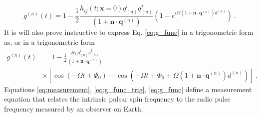 \documentclass[fleqn,usenatbib,useAMS]{mnras}
\begin{document}
\begin{equation}
	g^{(n)}(t) = 1 -  \frac{1}{2} \frac{h_{ij} (t; \boldsymbol{x}= 0)q^{i}_{(n)} q^{j}_{(n)} }{(1 + \boldsymbol{n}\cdot \boldsymbol{q}^{(n)}) }  \left(1 -e^{i \Omega \left(1 + \boldsymbol{n}\cdot \boldsymbol{q}^{(n)} \right)  d^{(n)}}\right) \ .
	\label{eq:g_func}
\end{equation}
It is will also prove instructive to express Eq. \ref{eq:g_func} in a trigonometric form as,
or in a trigonometric form 
\begin{align}
	g^{(n)}(t) &= 1 - \frac{1}{2} \frac{ H_{ij}q^i_{(n)} q^j_{(n)} }{(1 + \boldsymbol{n}\cdot \boldsymbol{q}^{(n)}) } \nonumber \\
	& \times \left[ \cos(-\Omega t +\Phi_0) - \cos \left(-\Omega t +\Phi_0 + \Omega \left(1 + \boldsymbol{n}\cdot \boldsymbol{q}^{(n)} \right)  d^{(n)} \right) \right] \ .
	\label{eq:g_func_trig}
\end{align}
Equations \ref{eq:measurement}, \ref{eq:g_func_trig}, \ref{eq:g_func}  define a measurement equation that relates the intrinsic pulsar spin frequency to the radio pulse frequency measured by an observer on Earth. 
\end{document}
